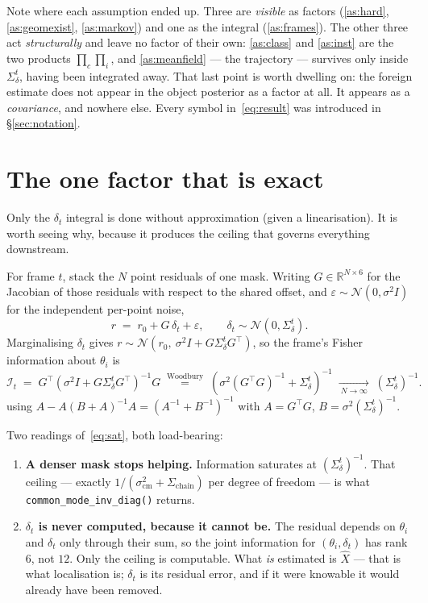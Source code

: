 \documentclass[11pt,a4paper]{report}
\newcommand{\R}{\mathbb{R}}
\theoremstyle{definition}   %
\begin{document}
\noindent
Note where each assumption ended up. Three are \emph{visible} as factors
(\ref{as:hard}, \ref{as:geomexist}, \ref{as:markov}) and one as the integral
(\ref{as:frames}). The other three act \emph{structurally} and leave no factor of their own:
\ref{as:class} and \ref{as:inst} are the two products $\prod_c\prod_i$, and
\ref{as:meanfield} --- the trajectory --- survives only inside $\Sigma_\delta^t$, having been
integrated away. That last point is worth dwelling on: the foreign estimate does not appear in
the object posterior as a factor at all. It appears as a \emph{covariance}, and nowhere else.
Every symbol in~\eqref{eq:result} was introduced in \S\ref{sec:notation}.

\section{The one factor that is exact}
\label{sec:exact}

Only the $\delta_t$ integral is done without approximation (given a linearisation). It is worth
seeing why, because it produces the ceiling that governs everything downstream.

For frame $t$, stack the $N$ point residuals of one mask. Writing $G\in\R^{N\times 6}$ for the
Jacobian of those residuals with respect to the shared offset, and $\varepsilon\sim
\mathcal{N}(0,\sigma^2 I)$ for the independent per-point noise,
\begin{equation}
r \;=\; r_0 + G\,\delta_t + \varepsilon,
\qquad \delta_t\sim\mathcal{N}(0,\Sigma_\delta^t).
\end{equation}
Marginalising $\delta_t$ gives $r\sim\mathcal{N}\!\left(r_0,\ \sigma^2 I+G\Sigma_\delta^t G^{\!\top}\right)$,
so the frame's Fisher information about $\theta_i$ is
\begin{equation}
\mathcal{I}_t \;=\; G^{\!\top}\!\left(\sigma^2 I+G\Sigma_\delta^t G^{\!\top}\right)^{-1}\!G
\;\overset{\text{Woodbury}}{=}\;
\left(\sigma^2\left(G^{\!\top}G\right)^{-1}+\Sigma_\delta^t\right)^{-1}
\;\xrightarrow[\ N\to\infty\ ]{}\;
\left(\Sigma_\delta^t\right)^{-1}.
\label{eq:sat}
\end{equation}
using $A-A(B+A)^{-1}A=(A^{-1}+B^{-1})^{-1}$ with $A=G^{\!\top}G$, $B=\sigma^2(\Sigma_\delta^t)^{-1}$.

Two readings of~\eqref{eq:sat}, both load-bearing:
\begin{enumerate}[leftmargin=1.6em]
\item \textbf{A denser mask stops helping.} Information saturates at $(\Sigma_\delta^t)^{-1}$.
      That ceiling --- exactly $1/(\sigma^2_{\mathrm{cm}}+\Sigma_{\text{chain}})$ per degree of
      freedom --- is what \texttt{common\_\allowbreak mode\_\allowbreak inv\_\allowbreak diag()}
      returns.
\item \textbf{$\delta_t$ is never computed, because it cannot be.} The residual depends on
      $\theta_i$ and $\delta_t$ only through their sum, so the joint information for
      $(\theta_i,\delta_t)$ has rank $6$, not $12$. Only the ceiling is computable. What
      \emph{is} estimated is $\hat X$ — that is what localisation is; $\delta_t$ is its residual
      error, and if it were knowable it would already have been removed.
\end{enumerate}
\end{document}
